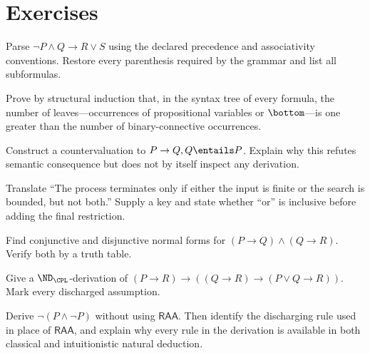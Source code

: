 \section{Exercises}
\label{sec:prop-metatheory-06}

\begin{exercise}
\label{ex:prop-metatheory-01}
Parse
\(\neg P\land Q\to R\lor S\) using the declared precedence and associativity
conventions.  Restore every parenthesis required by the grammar and list all
subformulas.
\end{exercise}

\begin{exercise}
\label{ex:prop-metatheory-02}
Prove by structural induction that, in the syntax tree of every formula, the
number of leaves---occurrences of propositional variables or \(\bottom\)---is
one greater than the number of binary-connective occurrences.
\end{exercise}

\begin{exercise}
\label{ex:prop-metatheory-03}
Construct a countervaluation to
\(P\to Q,Q\entails P\).  Explain why this refutes semantic consequence but
does not by itself inspect any derivation.
\end{exercise}

\begin{exercise}
\label{ex:prop-metatheory-04}
Translate ``The process terminates only if either the input is finite or the
search is bounded, but not both.''  Supply a key and state whether ``or'' is
inclusive before adding the final restriction.
\end{exercise}

\begin{exercise}
\label{ex:prop-metatheory-05}
Find conjunctive and disjunctive normal forms for
\((P\to Q)\land(Q\to R)\).  Verify both by a truth table.
\end{exercise}

\begin{exercise}
\label{ex:prop-metatheory-06}
Give a \(\ND_{\CPL}\)-derivation of
\((P\to R)\to((Q\to R)\to(P\lor Q\to R))\).
Mark every discharged assumption.
\end{exercise}

\begin{exercise}
\label{ex:prop-metatheory-07}
Derive \(\neg(P\land\neg P)\) without using \(\mathsf{RAA}\).  Then
identify the discharging rule used in place of \(\mathsf{RAA}\), and explain
why every rule in the derivation is available in both classical and
intuitionistic natural deduction.
\end{exercise}


